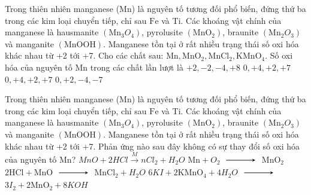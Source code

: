 \begin{ex}
	Trong thiên nhiên manganese (Mn) là nguyên tố tương đối phổ biến, đứng thứ ba trong các kim loại chuyển tiếp, chỉ sau $\mathrm{Fe}$ và Ti. Các khoáng vật chính của manganese là hausmanite $\left(\mathrm{Mn}_3O_4\right)$, pyrolusite $\left(\mathrm{MnO}_2\right)$, braunite $\left(\mathrm{Mn}_2O_3\right)$ và manganite $(\mathrm{MnOOH})$. Manganese tồn tại ở rất nhiều trạng thái số oxi hóa khác nhau từ +2 tới +7.
	Cho các chất sau: $\mathrm{Mn}, \mathrm{MnO}_2, \mathrm{MnCl}_2, \mathrm{KMnO}_4$. Số oxi hóa của nguyên tố $\mathrm{Mn}$ trong các chất lần lượt là
	\choice
	{$+2,-2,-4,+8$}
	{$0,+4,+2,+7$}
	{\True $0,+4,+2,+7$}
	{$0,+2,-4,-7$}
\end{ex}
\begin{ex}
	Trong thiên nhiên manganese (Mn) là nguyên tố tương đối phổ biến, đứng thứ ba trong các kim loại chuyển tiếp, chỉ sau $\mathrm{Fe}$ và Ti. Các khoáng vật chính của manganese là hausmanite $\left(\mathrm{Mn}_3O_4\right)$, pyrolusite $\left(\mathrm{MnO}_2\right)$, braunite $\left(\mathrm{Mn}_2O_3\right)$ và manganite $(\mathrm{MnOOH})$. Manganese tồn tại ở rất nhiều trạng thái số oxi hóa khác nhau từ +2 tới +7.
	Phản ứng nào sau đây không có sự thay đổi số oxi hóa của nguyên tố $\mathrm{Mn}$?
	\choice
	{\True $MnO+2HCl \xrightarrow MnCl_2+H_2O$}
	{$\mathrm{Mn}+O_2$ $\xrightarrow$ $ \mathrm{MnO}_2$}
	{$2 \mathrm{HCl}+\mathrm{MnO} $ $\xrightarrow$ $ \mathrm{MnCl}_2+H_2O$}
	{$6 KI+2 \mathrm{KMnO}_4+4 H_2O $ $\xrightarrow$ $ 3 I_2+2 \mathrm{MnO}_2+8 KOH$}
\end{ex}
